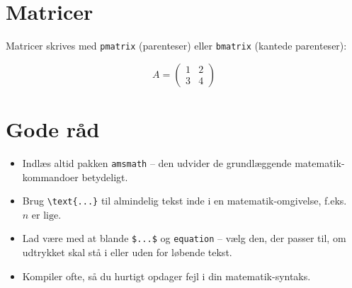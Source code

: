 \section{Matricer}
Matricer skrives med \texttt{pmatrix} (parenteser) eller
\texttt{bmatrix} (kantede parenteser):

\[
  A = \begin{pmatrix} 1 & 2 \\ 3 & 4 \end{pmatrix}
\]
 
\section{Gode råd}
\begin{itemize}
  \item Indlæs altid pakken \texttt{amsmath} -- den udvider de
    grundlæggende matematik-kommandoer betydeligt.
  \item Brug \texttt{\textbackslash text\{...\}} til almindelig tekst
    inde i en matematik-omgivelse, f.eks. $n \text{ er lige}$.
  \item Lad være med at blande \texttt{\$...\$} og \texttt{equation}
    -- vælg den, der passer til, om udtrykket skal stå i eller uden for
    løbende tekst.
  \item Kompiler ofte, så du hurtigt opdager fejl i din matematik-syntaks.
  \end{itemize}
  
